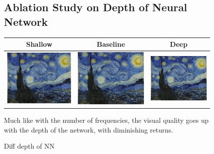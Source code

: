 \documentclass{article}
\begin{document}
\begin{figure}[h]
    \subsection{Ablation Study on Depth of Neural Network}
    \begin{tabular}{c c c}
       Shallow  & Baseline &  Deep\\ 
       \midrule
        \includegraphics[width=0.3\linewidth]{pe-15-shallow-norm-pred.png} & \includegraphics[width=0.3\linewidth]{no-15-norm-norm-pred.png} &
        \includegraphics[width=0.3\linewidth]{pe-15-deep-norm-pred.png}
    \end{tabular}
    \caption{Diff depth of NN}
    
Much like with the number of frequencies, the visual quality goes up with the depth of the network, with diminishing returns.
\end{figure}
\end{document}
